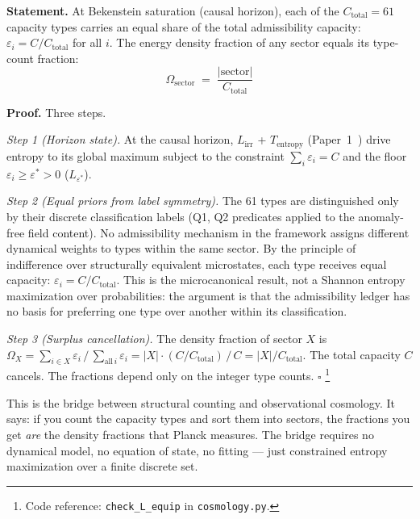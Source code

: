 \documentclass[11pt]{article}
\newcommand{\coderef}[2]{\footnote{Code reference: \texttt{#1} in \texttt{#2}.}}
\begin{document}
\begin{tcolorbox}[apfbox, title={$L_{\mathrm{equip}}$ (Horizon Equipartition)}]
\textbf{Statement.}  At Bekenstein saturation (causal horizon), each of the $C_{\mathrm{total}} = 61$ capacity types carries an equal share of the total admissibility capacity: $\varepsilon_i = C/C_{\mathrm{total}}$ for all $i$.  The energy density fraction of any sector equals its type-count fraction:
\begin{equation}
\Omega_{\mathrm{sector}} \;=\; \frac{|\mathrm{sector}|}{C_{\mathrm{total}}}
\label{eq:omega_equip}
\end{equation}

\smallskip\noindent\textbf{Proof.}  Three steps.

\textit{Step 1 (Horizon state).}  At the causal horizon, $L_{\mathrm{irr}}$ + $T_{\mathrm{entropy}}$ (Paper~1~\cite{BrookePaper1}) drive entropy to its global maximum subject to the constraint $\sum_i \varepsilon_i = C$ and the floor $\varepsilon_i \ge \varepsilon^* > 0$ ($L_{\varepsilon^*}$).

\textit{Step 2 (Equal priors from label symmetry).}  The 61 types are distinguished only by their discrete classification labels (Q1, Q2 predicates applied to the anomaly-free field content).  No admissibility mechanism in the framework assigns different dynamical weights to types within the same sector.  By the principle of indifference over structurally equivalent microstates, each type receives equal capacity: $\varepsilon_i = C / C_{\mathrm{total}}$.  This is the microcanonical result, not a Shannon entropy maximization over probabilities: the argument is that the admissibility ledger has no basis for preferring one type over another within its classification.

\textit{Step 3 (Surplus cancellation).}  The density fraction of sector $X$ is $\Omega_X = \sum_{i \in X} \varepsilon_i \,/\, \sum_{\mathrm{all}\,i} \varepsilon_i = |X| \cdot (C/C_{\mathrm{total}}) \,/\, C = |X|/C_{\mathrm{total}}$.  The total capacity $C$ cancels.  The fractions depend only on the integer type counts.  $\square$
\coderef{check\_L\_equip}{cosmology.py}
\end{tcolorbox}

This is the bridge between structural counting and observational cosmology.  It says: if you count the capacity types and sort them into sectors, the fractions you get \emph{are} the density fractions that Planck measures.  The bridge requires no dynamical model, no equation of state, no fitting --- just constrained entropy maximization over a finite discrete set.
\end{document}
